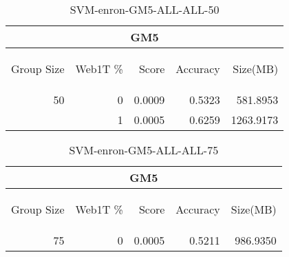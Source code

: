 \begin{center}
\begin{table}[htbp] 
 \begin{center}
\begin{tabular}{ | r | r | r | r | r |}
\hline
\multicolumn{5}{|c|}{GM5}\\
\hline
\begin{sideways}Group Size\end{sideways} & \begin{sideways}Web1T \%\end{sideways} & \begin{sideways}Score\end{sideways} & \begin{sideways}Accuracy\end{sideways} & \begin{sideways}Size(MB)\end{sideways}\\
\hline
\multirow{1}{*}{50}
 & 0 & 0.0009 & 0.5323 & 581.8953\\ \cline{2-5}
 & 1 & 0.0005 & 0.6259 & 1263.9173\\ \cline{2-5}
\hline
\end{tabular}
\caption{SVM-enron-GM5-ALL-ALL-50}
\label{table:SVM-enron-GM5-ALL-ALL-50}
\end{center}
 \end{table}
\end{center}

\begin{center}
\begin{table}[htbp] 
 \begin{center}
\begin{tabular}{ | r | r | r | r | r |}
\hline
\multicolumn{5}{|c|}{GM5}\\
\hline
\begin{sideways}Group Size\end{sideways} & \begin{sideways}Web1T \%\end{sideways} & \begin{sideways}Score\end{sideways} & \begin{sideways}Accuracy\end{sideways} & \begin{sideways}Size(MB)\end{sideways}\\
\hline
\multirow{0}{*}{75}
 & 0 & 0.0005 & 0.5211 & 986.9350\\ \cline{2-5}
\hline
\end{tabular}
\caption{SVM-enron-GM5-ALL-ALL-75}
\label{table:SVM-enron-GM5-ALL-ALL-75}
\end{center}
 \end{table}
\end{center}

